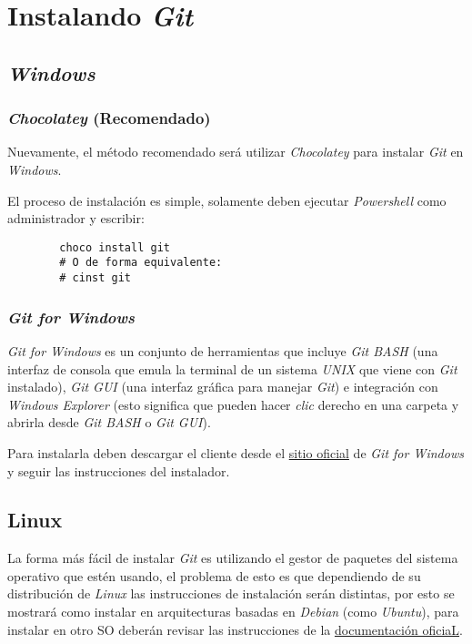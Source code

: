 \section{Instalando \textit{Git}}
 	\subsection{\textit{Windows}}
    \subsubsection{\textit{Chocolatey} (Recomendado)}
      Nuevamente, el método recomendado será utilizar \textit{Chocolatey} para 
      instalar \textit{Git} en \textit{Windows}.
      
      El proceso de instalación es simple, solamente deben ejecutar 
      \textit{Powershell} como administrador y escribir:
      \begin{verbatim}
        choco install git 
        # O de forma equivalente:
        # cinst git
      \end{verbatim}
    
    \subsubsection{\textit{Git for Windows}}
      \textit{Git for Windows} es un conjunto de herramientas que incluye \textit{Git 
      BASH} (una interfaz de consola que emula la terminal de un sistema \textit{UNIX} 
      que viene con \textit{Git} instalado), \textit{Git GUI} (una interfaz gráfica para 
      manejar \textit{Git}) e integración con \textit{Windows Explorer} (esto significa 
      que pueden hacer \textit{clic} derecho en una carpeta y abrirla desde \textit{Git 
      BASH} o \textit{Git GUI}).
      
      Para instalarla deben descargar el cliente desde el 
      \href{https://gitforwindows.org}{sitio oficial} de \textit{Git for Windows} y 
      seguir las instrucciones del instalador.

  \subsection{Linux}
    La forma más fácil de instalar \textit{Git} es utilizando el gestor de paquetes del
    sistema operativo que estén usando, el problema de esto es que dependiendo de su distribución
    de \textit{Linux} las instrucciones de instalación serán distintas, por esto se 
    mostrará como instalar en arquitecturas basadas en \textit{Debian} (como \textit{Ubuntu}), para 
    instalar en otro SO deberán revisar las instrucciones de la 
    \href{https://git-scm.com/download/linux}{documentación oficiaL}.

